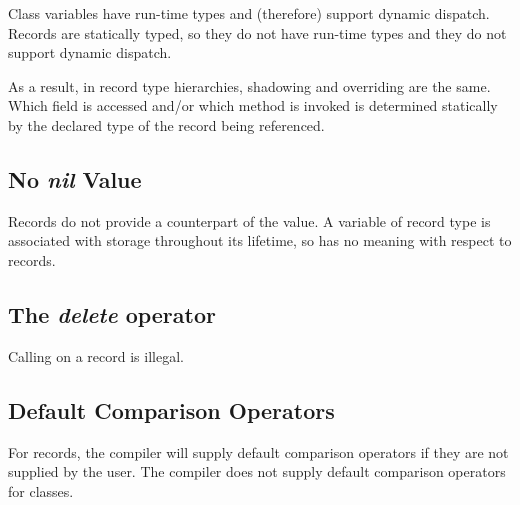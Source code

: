 Class variables have run-time types and (therefore) support dynamic dispatch.
Records are statically typed, so they do not have run-time types and they do not
support dynamic dispatch.

As a result, in record type hierarchies, shadowing and overriding are the same.  
Which field is accessed
and/or which method is invoked is determined statically by the declared type of
the record being referenced.

\subsection{No {\em nil} Value}

Records do not provide a counterpart of the  value.  A variable of
record type is associated with storage throughout its lifetime, so 
has no meaning with respect to records.

\subsection{The {\em delete} operator}
\label{Record_Delete_Illegal}

Calling  on a record is illegal.


\subsection{Default Comparison Operators}
\label{Comparison_Operator_Differences}

For records, the compiler will supply default comparison operators if they are
not supplied by the user.  The compiler does not supply default comparison
operators for classes.

